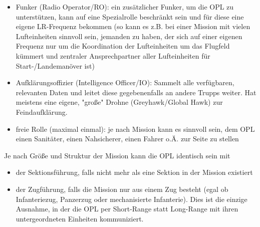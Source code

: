 \begin{itemize}
	\item Funker (Radio Operator/RO): ein zusätzlicher Funker, um die OPL zu unterstützen, kann auf eine Spezialrolle beschränkt sein und für diese eine eigene LR-Frequenz bekommen (so kann es z.B. bei einer Mission mit vielen Lufteinheiten sinnvoll sein, jemanden zu haben, der sich auf einer eigenen Frequenz nur um die Koordination der Lufteinheiten um das Flugfeld kümmert und zentraler Ansprechpartner aller Lufteinheiten für Start-/Landemanöver ist)
	\item Aufklärungsoffizier (Intelligence Officer/IO): Sammelt alle verfügbaren, relevanten Daten und leitet diese gegebenenfalls an andere Trupps weiter. Hat meistens eine eigene, "große" Drohne (Greyhawk/Global Hawk) zur Feindaufklärung.
	\item freie Rolle (maximal einmal): je nach Mission kann es sinnvoll sein, dem OPL einen Sanitäter, einen Nahsicherer, einen Fahrer o.Ä. zur Seite zu stellen
\end{itemize}
Je nach Größe und Struktur der Mission kann die OPL identisch sein mit
\begin{itemize}
	\item der Sektionsführung, falls nicht mehr als eine Sektion in der Mission existiert
	\item der Zugführung, falls die Mission nur aus einem Zug besteht (egal ob Infanteriezug, Panzerzug oder mechanisierte Infanterie). Dies ist die einzige Ausnahme, in der die OPL per Short-Range statt Long-Range mit ihren untergeordneten Einheiten kommuniziert.
\end{itemize}